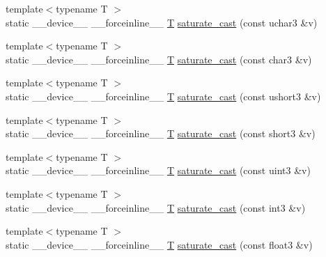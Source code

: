 \begin{DoxyCompactItemize}
\item 
{\footnotesize template$<$typename T $>$ }\\static \-\_\-\-\_\-device\-\_\-\-\_\- \-\_\-\-\_\-forceinline\-\_\-\-\_\- \hyperlink{calib3d_8hpp_a3efb9551a871ddd0463079a808916717}{T} \hyperlink{namespacecv_1_1gpu_1_1device_af8284d084a9ca9933c014681c943237d}{saturate\-\_\-cast} (const uchar3 \&v)
\item 
{\footnotesize template$<$typename T $>$ }\\static \-\_\-\-\_\-device\-\_\-\-\_\- \-\_\-\-\_\-forceinline\-\_\-\-\_\- \hyperlink{calib3d_8hpp_a3efb9551a871ddd0463079a808916717}{T} \hyperlink{namespacecv_1_1gpu_1_1device_adb7e45f6278fcec48b7dffe6edcf99b7}{saturate\-\_\-cast} (const char3 \&v)
\item 
{\footnotesize template$<$typename T $>$ }\\static \-\_\-\-\_\-device\-\_\-\-\_\- \-\_\-\-\_\-forceinline\-\_\-\-\_\- \hyperlink{calib3d_8hpp_a3efb9551a871ddd0463079a808916717}{T} \hyperlink{namespacecv_1_1gpu_1_1device_a2c49ddf34a19b428992f156d3b703c1d}{saturate\-\_\-cast} (const ushort3 \&v)
\item 
{\footnotesize template$<$typename T $>$ }\\static \-\_\-\-\_\-device\-\_\-\-\_\- \-\_\-\-\_\-forceinline\-\_\-\-\_\- \hyperlink{calib3d_8hpp_a3efb9551a871ddd0463079a808916717}{T} \hyperlink{namespacecv_1_1gpu_1_1device_ae77997ee1b5613274a7625dab348d3da}{saturate\-\_\-cast} (const short3 \&v)
\item 
{\footnotesize template$<$typename T $>$ }\\static \-\_\-\-\_\-device\-\_\-\-\_\- \-\_\-\-\_\-forceinline\-\_\-\-\_\- \hyperlink{calib3d_8hpp_a3efb9551a871ddd0463079a808916717}{T} \hyperlink{namespacecv_1_1gpu_1_1device_a5e46931de8a39cc5101b73ccc79885eb}{saturate\-\_\-cast} (const uint3 \&v)
\item 
{\footnotesize template$<$typename T $>$ }\\static \-\_\-\-\_\-device\-\_\-\-\_\- \-\_\-\-\_\-forceinline\-\_\-\-\_\- \hyperlink{calib3d_8hpp_a3efb9551a871ddd0463079a808916717}{T} \hyperlink{namespacecv_1_1gpu_1_1device_af373deffabb256baf1f69832f80cd0e2}{saturate\-\_\-cast} (const int3 \&v)
\item 
{\footnotesize template$<$typename T $>$ }\\static \-\_\-\-\_\-device\-\_\-\-\_\- \-\_\-\-\_\-forceinline\-\_\-\-\_\- \hyperlink{calib3d_8hpp_a3efb9551a871ddd0463079a808916717}{T} \hyperlink{namespacecv_1_1gpu_1_1device_afdc37afdc4b7149c0953f669034e148f}{saturate\-\_\-cast} (const float3 \&v)

\end{DoxyCompactItemize}
